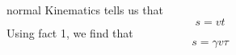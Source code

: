 \begin{solution}{normal}
Kinematics tells us that
\[s = vt\]Using fact 1, we find that
\[\boxed{s = \gamma v\tau}\]
\end{solution}